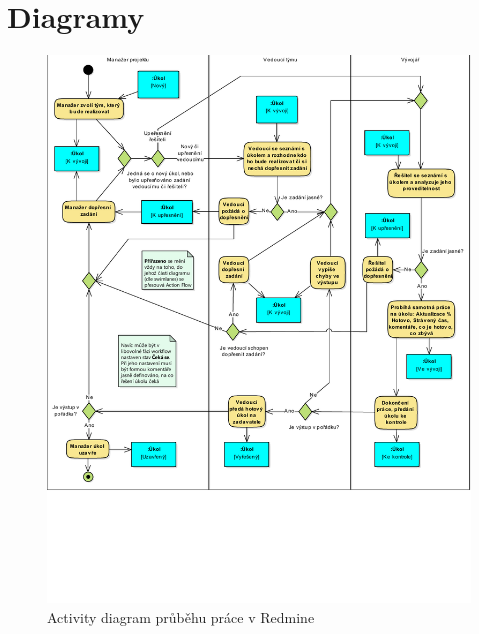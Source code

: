 \chapter{Diagramy} \label{ap:diagrams}

\begin{figure}[]
\includegraphics[width=\textwidth]{../pdf/dbs-workflow.pdf}
\caption{Activity diagram průběhu práce v Redmine} \label{picture:activity}
\end{figure}
